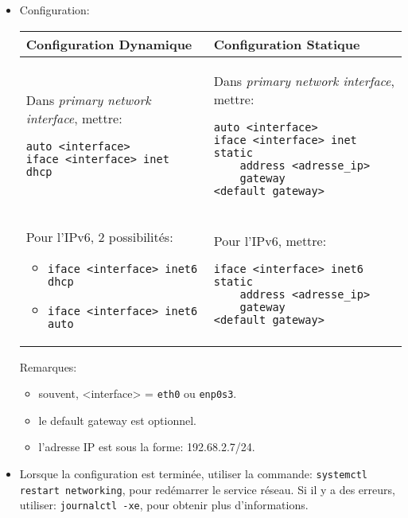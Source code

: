\documentclass[a4paper]{article}
\renewcommand{\tt}{\texttt}
\begin{document}
\begin{itemize}
\item Configuration:
\begin{center}
\begin{tabular}{|p{7.5cm}|p{7.5cm}|} \hline
\textbf{Configuration Dynamique} & \textbf{Configuration Statique} \\ \hline
Dans \textit{primary network interface}, mettre:
\begin{example}
\begin{verbatim}
auto <interface>
iface <interface> inet dhcp
\end{verbatim}
\end{example}
&
Dans \textit{primary network interface}, mettre:
\begin{example}
\begin{verbatim}
auto <interface>
iface <interface> inet static
    address <adresse_ip>
    gateway <default_gateway>
\end{verbatim}
\end{example}
\\ \hline
Pour l'IPv6, 2 possibilités:
\begin{itemize}
    \item \tt{iface <interface> inet6 dhcp}
    \item \tt{iface <interface> inet6 auto}
\end{itemize}
&
Pour l'IPv6, mettre:
\begin{example}
\begin{verbatim}
iface <interface> inet6 static
    address <adresse_ip>
    gateway <default_gateway>
\end{verbatim}
\end{example}
\\ \hline
\end{tabular}
\end{center}
Remarques:
\begin{itemize}
    \item souvent, <interface> = \tt{eth0} ou \tt{enp0s3}.
    \item le default gateway est optionnel.
    \item l'adresse IP est sous la forme: 192.68.2.7/24.
\end{itemize}





\item Lorsque la configuration est terminée, utiliser la commande: \tt{systemctl restart networking}, pour redémarrer le service réseau. Si il y a des erreurs, utiliser: \tt{journalctl -xe}, pour obtenir plus d'informations.






\end{itemize}
\end{document}
